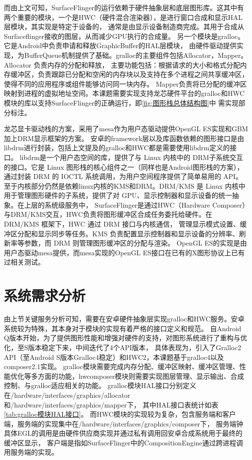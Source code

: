 而由上文可知，SurfaceFlinger的运行依赖于硬件抽象层和底层图形库。这其中有两个重要的模块，一个是HWC（硬件混合渲染器），是进行窗口合成和显示HAL层模块，其实现是特定于设备的，
通常是由显示设备制造商完成。其用于合成从Surfaceflinger接收的图层，从而减少GPU执行的合成量。
另一个模块是gralloc。它是Android中负责申请和释放GraphicBuffer的HAL层模块，
由硬件驱动提供实现，为BufferQueue机制提供了基础。gralloc的主要组件包括Allocator，Mapper。Allocator 负责内存的分配和释放，
主要功能包括：根据请求的大小和格式分配内存缓冲区，负责跟踪已分配和空闲的内存块以及支持在多个进程之间共享缓冲区，使得不同的应用程序或组件能够访问同一块内存。
Mapper负责将已分配的缓冲区映射到进程的虚拟地址空间。本课题需要实现支持龙芯硬件平台的gralloc和HWC模块的库以支持SurfaceFlinger的正确运行，即\ref{fig:图形栈总体结构图}中
需实现部分标注。

龙芯显卡驱动栈的方案，采用了mesa作为用户态驱动提供OpenGL ES实现和GBM加上DRM显示框架的方案。
安卓的framework层以及库函数依赖的图形接口是由libdrm进行封装，包括上文提及的gralloc和HWC都是需要使用libdrm定义的接口。
libdrm是一个用户态空间的库，提供了与 Linux 内核中的 DRM子系统交互的接口。它是 Linux 图形栈的核心组件之一（同样也是Android图形栈的方案），
通过封装 DRM 的 IOCTL 系统调用，为用户空间程序提供了简单易用的 API。
至于内核部分仍然是依赖linux内核的KMS和DRM。DRM/KMS 是 Linux 内核中用于管理图形硬件的子系统，提供了对 GPU、显示控制器和显示设备的统一抽象。在上层的系统级服务中，
SurfaceFlinger是通过HWC（Hardware Composer）与DRM/KMS交互，HWC负责将图形缓冲区合成任务委托给硬件。在 DRM/KMS 框架下，HWC 通过 DRM 接口与内核通信，
管理显示模式设置、缓冲区分配和显示同步等任务。KMS 负责配置显示控制器和显示设备的分辨率、刷新率等参数，而 DRM 则管理图形缓冲区的分配与渲染。
OpenGL ES的实现是由用户态驱动mesa提供，而mesa实现的OpenGL ES接口在已有的X图形协议上已有过相关测试。


\section{系统需求分析}

由上节关键服务分析可知，需要在安卓硬件抽象层实现gralloc和HWC服务。安卓系统较为特殊，其本身对于模块的实现有着严格的接口定义和规范。
自Android Q版本开始，为了提供图形性能和增强对硬件的支持，对图形系统进行了重构与优化，至S版本稳定下来，中间迭代了4个API版本，
具体表现为，引入了Gralloc2 API（至Android S版本Gralloc4稳定）和HWC2，本课题基于gralloc4以及composer2.1实现。
gralloc模块需要完成内存分配、缓冲区映射、缓冲区管理、性能优化等多方面的功能，hwcomposer模块则需要实现图层管理、显示输出、合成控制、与gralloc适应相关的功能。
gralloc模块HAL接口分别定义在/hardware/interfaces/graphics/allocator和/hardware/interfaces/graphics/mapper下，
其中HAL接口表统计如表\ref{tab:gralloc模块HAL接口}。
而HWC模块的实现较为复杂，包含服务端和客户端，服务端的实现集中在/hardware/interfaces/graphics/composer下，
服务端钟具体EGL的调用是由硬件供应商实现并通过私有调用回安卓合成系统用于最终的缓冲区显示\cite{baiget2019architecture}，
客户端是指如SurfaceFlinger中的CompositionEngine通过跨进程调用服务端的实现。

